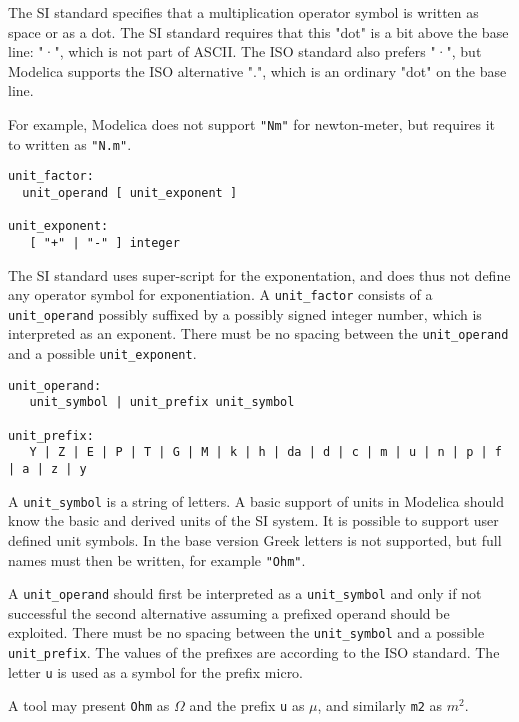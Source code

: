 The SI standard specifies that a multiplication operator symbol is written as space 
or as a dot. The SI standard requires that this "dot" is a bit above the base line: "·", which is not part of ASCII. 
The ISO standard also prefers "·", but Modelica supports the ISO alternative ".", which is an ordinary "dot" on the base line.

For example, Modelica does not support \lstinline!"Nm"! for newton-meter, 
but requires it to written as \lstinline!"N.m"!. 

\begin{lstlisting}[language=grammar]
unit_factor:
  unit_operand [ unit_exponent ]

unit_exponent:
   [ "+" | "-" ] integer
\end{lstlisting}

The SI standard uses super-script for the exponentation, and does thus not define any operator symbol for exponentiation.
A \lstinline!unit_factor! consists of a \lstinline!unit_operand! possibly suffixed by a
possibly signed integer number, which is interpreted as an exponent.
There must be no spacing between the \lstinline!unit_operand! and a possible
\lstinline!unit_exponent!.

\begin{lstlisting}[language=grammar]
unit_operand:
   unit_symbol | unit_prefix unit_symbol

unit_prefix:
   Y | Z | E | P | T | G | M | k | h | da | d | c | m | u | n | p | f | a | z | y
\end{lstlisting}

A \lstinline!unit_symbol! is a string of letters. A basic support of units in
Modelica should know the basic and derived units of the SI system. It is
possible to support user defined unit symbols. In the base version Greek
letters is not supported, but full names must then be written, for
example \lstinline!"Ohm"!.

A \lstinline!unit_operand! should first be interpreted as a \lstinline!unit_symbol! and only
if not successful the second alternative assuming a prefixed operand
should be exploited. There must be no spacing between the \lstinline!unit_symbol!
and a possible \lstinline!unit_prefix!. The values of the prefixes are according to
the ISO standard. The letter \lstinline!u! is used as a symbol for the prefix
micro.

\begin{nonnormative}
A tool may present \lstinline!Ohm! as $\Omega$ and the prefix \lstinline!u! as $\mu$, and similarly \lstinline!m2! as $m^2$. 
\end{nonnormative}

